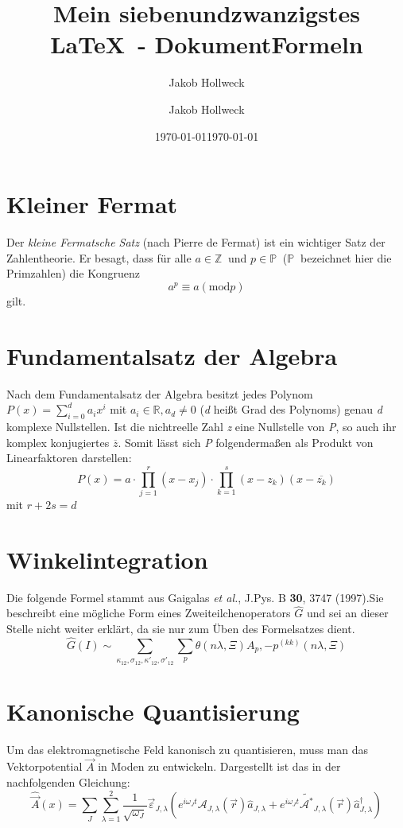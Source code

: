 \documentclass{scrartcl}
\title{Mein siebenundzwanzigstes \LaTeX\ -  Dokument}
\author{Jakob Hollweck}
\date{\today}
\begin{document}
	\begin{titlepage}
		\title{Formeln}
		\author{Jakob Hollweck}
		\date{\today}
	\end{titlepage}
	
	\maketitle
	
	\section{Kleiner Fermat}
	Der \textit{kleine Fermatsche Satz} (nach Pierre de Fermat) ist ein wichtiger Satz der Zahlentheorie. Er besagt, dass für alle $a \in \mathbb{Z}\ $ und $ p \in \mathbb{P}\ $ ($\mathbb{P}\ $ bezeichnet hier die Primzahlen) die Kongruenz \[ a^p \equiv a (\mathrm{mod }p)
	\] gilt.
	
	\section{Fundamentalsatz der Algebra}
	Nach dem Fundamentalsatz der Algebra besitzt jedes Polynom $ P(x)= \sum_{i=0}^d a_ix^i$ mit $a_i \in \mathbb{R}, a_d \neq 0$ (\textit{d} heißt Grad des Polynoms) genau \textit{d} komplexe Nullstellen. Ist die nichtreelle Zahl \textit{z} eine Nullstelle von \textit{P}, so auch ihr komplex konjugiertes $\overline{z}$. Somit lässt sich \textit{P} folgendermaßen als Produkt von Linearfaktoren darstellen: 
	\[ 
	P(x)=a \cdot \prod_{j=1}^{r}(x-x_j) \cdot \prod_{k=1}^{s} (x-z_k)(x-\overline{z_k})
	\]
	mit $r+2s=d$
	
	\section{Winkelintegration}
	Die folgende Formel stammt aus Gaigalas \textit{et al.}, J.Pys. B \textbf{30}, 3747 (1997).Sie beschreibt eine mögliche Form eines Zweiteilchenoperators $\hat{G}$ und sei an dieser Stelle nicht weiter erklärt, da sie nur zum Üben des Formelsatzes dient.
	\[
	\hat{G}(I) \sim \sum_{\kappa_{12}, \sigma_{12}, \kappa'_{12}, \sigma'_{12}}
	\sum_p\theta(n\lambda, \Xi)A_p,-p^{(kk)}(n\lambda, \Xi)
	\]
	
	\section{Kanonische Quantisierung}
	Um das elektromagnetische Feld kanonisch zu quantisieren, muss man das Vektorpotential $\vec{A}$ in Moden zu entwickeln. Dargestellt ist das in der nachfolgenden Gleichung:
	\begin{equation}
	\hat{\vec{A}}(x) = \sum_J\sum_{\lambda=1}^2 \frac{1}{\sqrt{\omega_J}}\vec{\varepsilon}_{J,\lambda}\left(e^{i\omega_Jt}\mathcal{A}_{J,\lambda}(\vec{r})\hat{a}_{J,\lambda}+e^{i\omega_Jt}\tilde{\mathcal{A^*}}_{J,\lambda}(\vec{r})
	\hat{a}^{\dagger}_{J,\lambda}
	\right)
	\end{equation}
	
\end{document}
